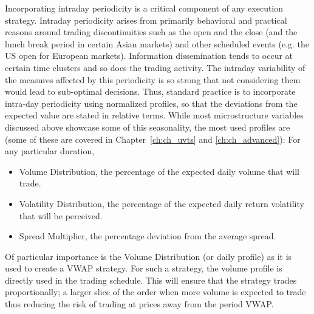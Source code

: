 Incorporating intraday periodicity is a critical component of any execution strategy. Intraday periodicity arises from primarily behavioral and practical reasons around trading discontinuities such as the open and the close (and the lunch break period in certain Asian markets) and other scheduled events (e.g. the US open for European markets). Information dissemination tends to occur at certain time clusters and so does the trading activity. The intraday variability of the measures affected by this periodicity is so strong that not considering them would lead to sub-optimal decisions. Thus, standard practice is to incorporate intra-day periodicity using normalized profiles, so that the deviations from the expected value are stated in relative terms. While most microstructure variables discussed above showcase some of this seasonality, the most used profiles are (some of these are covered in Chapter~\ref{ch:ch_uvts} and \ref{ch:ch_advanced}): For any particular duration,
	\begin{itemize}
	\item Volume Distribution, the percentage of the expected daily volume that will trade.
	\item Volatility Distribution, the percentage of the expected daily return volatility that will  be perceived.
	\item Spread Multiplier, the percentage deviation from the average spread.
	\end{itemize}
Of particular importance is the Volume Distribution (or daily profile) as it is used to create a VWAP strategy. For such a strategy, the volume profile is directly used in the trading schedule. This will ensure that the strategy trades proportionally; a larger slice of the order when more volume is expected to trade thus reducing the risk of trading at prices away from the period VWAP.


